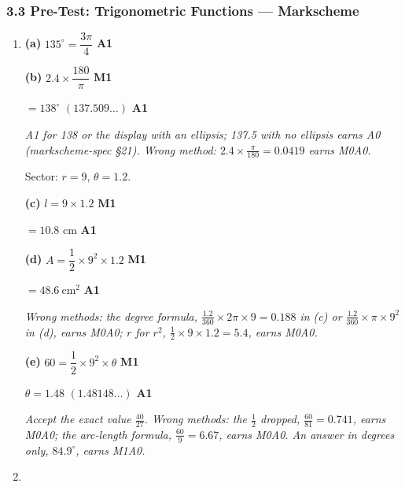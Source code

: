 \documentclass[12pt, twoside]{article}
\begin{document}
\subsubsection*{3.3 Pre-Test: Trigonometric Functions --- Markscheme}

\begin{enumerate}[itemsep=0.3cm]

\item[1.] [Maximum mark: 9]

\textbf{(a)} $135^\circ = \dfrac{3\pi}{4}$ \hfill \textbf{A1}

\textbf{(b)} $2.4 \times \dfrac{180}{\pi}$ \hfill \textbf{M1}

$= 138^\circ$ \quad $(137.509\ldots)$ \hfill \textbf{A1}

\emph{A1 for 138 or the display with an ellipsis; 137.5 with no ellipsis
earns A0 (markscheme-spec \S21). Wrong method: $2.4 \times \frac{\pi}{180}
= 0.0419$ earns M0A0.}

Sector: $r = 9$, $\theta = 1.2$.

\textbf{(c)} $l = 9 \times 1.2$ \hfill \textbf{M1}

$= 10.8$ cm \hfill \textbf{A1}

\textbf{(d)} $A = \dfrac{1}{2} \times 9^{2} \times 1.2$ \hfill \textbf{M1}

$= 48.6\ \text{cm}^{2}$ \hfill \textbf{A1}

\emph{Wrong methods: the degree formula, $\frac{1.2}{360} \times 2\pi
\times 9 = 0.188$ in (c) or $\frac{1.2}{360} \times \pi \times 9^{2}$ in
(d), earns M0A0; $r$ for $r^{2}$, $\frac{1}{2} \times 9 \times 1.2 = 5.4$,
earns M0A0.}

\textbf{(e)} $60 = \dfrac{1}{2} \times 9^{2} \times \theta$ \hfill \textbf{M1}

$\theta = 1.48$ \quad $(1.48148\ldots)$ \hfill \textbf{A1}

\emph{Accept the exact value $\frac{40}{27}$. Wrong methods: the
$\frac{1}{2}$ dropped, $\frac{60}{81} = 0.741$, earns M0A0; the arc-length
formula, $\frac{60}{9} = 6.67$, earns M0A0. An answer in degrees only,
$84.9^\circ$, earns M1A0.}

\newpage

\item[2.] [Maximum mark: 10]


\end{enumerate}
\end{document}
